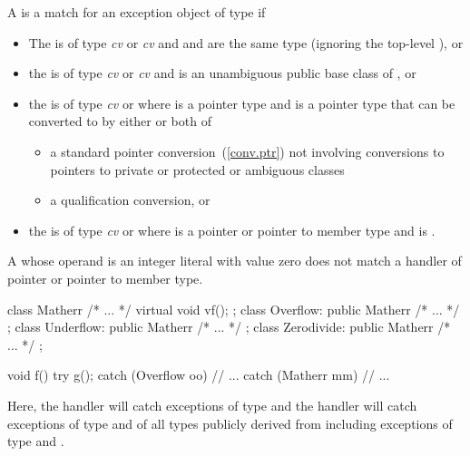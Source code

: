 \pnum
{}%
A
is a match for
an exception object
of type
if
\begin{itemize}
\item%
The
is of type
\textit{cv}
or
\textit{cv}
and
and
are the same type (ignoring the top-level
),
or
\item%
the
is of type
\textit{cv}
or
\textit{cv}
and
is an unambiguous public base class of
,
or
\item%
the
is of type
\textit{cv}
 or  where  is a pointer type
and
is a pointer type that can be
converted to 
by either or both of
\begin{itemize}

\item%
a standard pointer conversion~(\ref{conv.ptr}) not involving conversions
to pointers to private or protected or ambiguous classes
\item%
a qualification conversion, or

\end{itemize}

\item
the  is of type \textit{cv}  or  where  is a pointer or pointer to member type and  is .

\end{itemize}

\enternote
A
whose operand is an integer literal with value zero does not match a handler of
pointer or pointer to member type.
\exitnote

\enterexample
\begin{codeblock}
class Matherr { /* ... */ virtual void vf(); };
class Overflow: public Matherr { /* ... */ };
class Underflow: public Matherr { /* ... */ };
class Zerodivide: public Matherr { /* ... */ };

void f() {
  try {
    g();
  } catch (Overflow oo) {
        // ...
  } catch (Matherr mm) {
        // ...
  }
}
\end{codeblock}
Here, the
handler will catch exceptions of type
and the
handler will catch exceptions of type
and of all types publicly derived from
including exceptions of type
and
.
\exitexample


